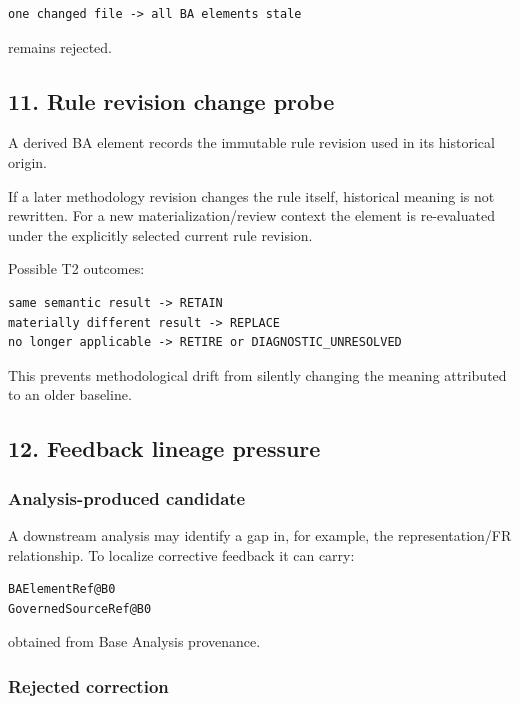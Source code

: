 \documentclass[11pt,a4paper]{article}
\begin{document}
\begin{verbatim}
one changed file -> all BA elements stale
\end{verbatim}

remains rejected.

\subsection{11. Rule revision change
probe}\label{rule-revision-change-probe}

A derived BA element records the immutable rule revision used in its
historical origin.

If a later methodology revision changes the rule itself, historical
meaning is not rewritten. For a new materialization/review context the
element is re-evaluated under the explicitly selected current rule
revision.

Possible T2 outcomes:

\begin{verbatim}
same semantic result -> RETAIN
materially different result -> REPLACE
no longer applicable -> RETIRE or DIAGNOSTIC_UNRESOLVED
\end{verbatim}

This prevents methodological drift from silently changing the meaning
attributed to an older baseline.

\subsection{12. Feedback lineage
pressure}\label{feedback-lineage-pressure}

\subsubsection{Analysis-produced
candidate}\label{analysis-produced-candidate}

A downstream analysis may identify a gap in, for example, the
representation/FR relationship. To localize corrective feedback it can
carry:

\begin{verbatim}
BAElementRef@B0
GovernedSourceRef@B0
\end{verbatim}

obtained from Base Analysis provenance.

\subsubsection{Rejected correction}\label{rejected-correction}
\end{document}
